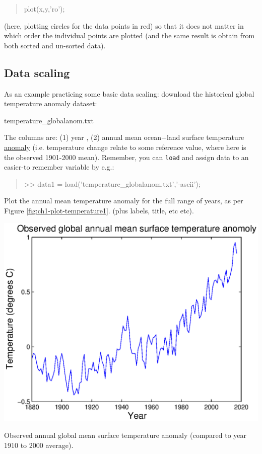 \documentclass{tufte-book} %
\newenvironment{docspec}{\begin{quotation}\ttfamily\parskip0pt\parindent0pt\ignorespaces}{\end{quotation}}
\begin{document}
\begin{docspec}
plot(x,y,'ro');
\end{docspec}

\noindent (here, plotting circles for the data points in red) so that it does not matter in which order the individual points are plotted (and the same result is obtain from both sorted and un-sorted data).


\subsection{Data scaling}

\noindent As an example practicing some basic data scaling: download the historical global temperature anomaly dataset:

\vspace{1mm} \noindent \textsf{temperature\_globalanom.txt} \vspace{1mm}

The columns are: (1) year , (2) annual mean ocean+land surface temperature \uline{anomaly} (i.e. temperature change relate to some reference value, where here is the observed 1901-2000 mean). Remember, you can \texttt{load} and assign data to an easier-to remember variable by e.g.:

\begin{docspec}
>> data1 = load('temperature\_globalanom.txt','-ascii');
\end{docspec}

Plot the annual mean temperature anomaly for the full range of years, as per Figure \ref{fig:ch1-plot-temperature1}. (plus labels, title, etc etc).

\begin{marginfigure}[0.0in]
\includegraphics[width=\linewidth]{ch1-plot-temperature1.eps}
\caption{Observed annual global mean surface temperature anomaly (compared to year 1910 to 2000 average).}
\label{fig:ch1-plot-temperature1}
\end{marginfigure}
\end{document}
